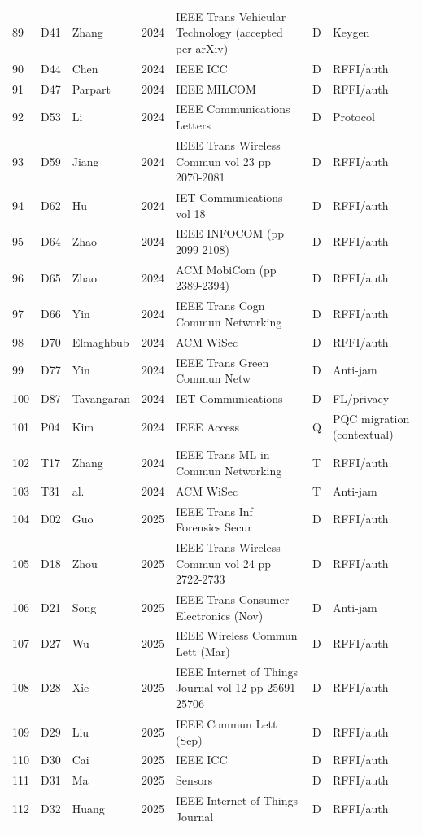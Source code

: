 \begin{table}[p]
\begin{tabular}{@{}lllll>{\raggedright\arraybackslash}p{3.3cm}>{\raggedright\arraybackslash}p{1.9cm}@{}}
89 & D41 & Zhang & 2024 & IEEE Trans Vehicular Technology (accepted per arXiv) & D & Keygen \\
90 & D44 & Chen & 2024 & IEEE ICC & D & RFFI/auth \\
91 & D47 & Parpart & 2024 & IEEE MILCOM & D & RFFI/auth \\
92 & D53 & Li & 2024 & IEEE Communications Letters & D & Protocol \\
93 & D59 & Jiang & 2024 & IEEE Trans Wireless Commun vol 23 pp 2070-2081 & D & RFFI/auth \\
94 & D62 & Hu & 2024 & IET Communications vol 18 & D & RFFI/auth \\
95 & D64 & Zhao & 2024 & IEEE INFOCOM (pp 2099-2108) & D & RFFI/auth \\
96 & D65 & Zhao & 2024 & ACM MobiCom (pp 2389-2394) & D & RFFI/auth \\
97 & D66 & Yin & 2024 & IEEE Trans Cogn Commun Networking & D & RFFI/auth \\
98 & D70 & Elmaghbub & 2024 & ACM WiSec & D & RFFI/auth \\
99 & D77 & Yin & 2024 & IEEE Trans Green Commun Netw & D & Anti-jam \\
100 & D87 & Tavangaran & 2024 & IET Communications & D & FL/privacy \\
101 & P04 & Kim & 2024 & IEEE Access & Q & PQC migration (contextual) \\
102 & T17 & Zhang & 2024 & IEEE Trans ML in Commun Networking & T & RFFI/auth \\
103 & T31 & al. & 2024 & ACM WiSec & T & Anti-jam \\
104 & D02 & Guo & 2025 & IEEE Trans Inf Forensics Secur & D & RFFI/auth \\
105 & D18 & Zhou & 2025 & IEEE Trans Wireless Commun vol 24 pp 2722-2733 & D & RFFI/auth \\
106 & D21 & Song & 2025 & IEEE Trans Consumer Electronics (Nov) & D & Anti-jam \\
107 & D27 & Wu & 2025 & IEEE Wireless Commun Lett (Mar) & D & RFFI/auth \\
108 & D28 & Xie & 2025 & IEEE Internet of Things Journal vol 12 pp 25691-25706 & D & RFFI/auth \\
109 & D29 & Liu & 2025 & IEEE Commun Lett (Sep) & D & RFFI/auth \\
110 & D30 & Cai & 2025 & IEEE ICC & D & RFFI/auth \\
111 & D31 & Ma & 2025 & Sensors & D & RFFI/auth \\
112 & D32 & Huang & 2025 & IEEE Internet of Things Journal & D & RFFI/auth \\

\end{tabular}
\end{table}
